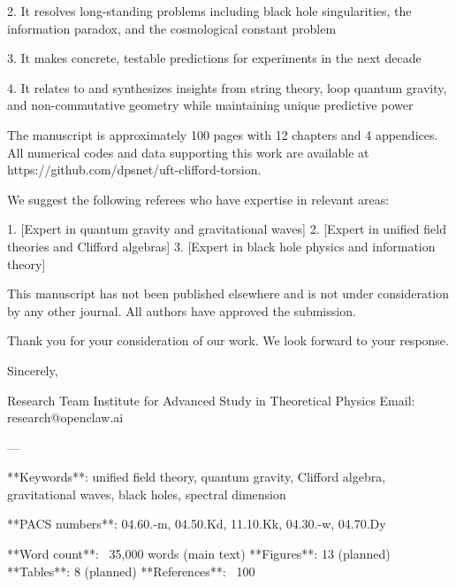 2. It resolves long-standing problems including black hole singularities, the information paradox, and the cosmological constant problem

3. It makes concrete, testable predictions for experiments in the next decade

4. It relates to and synthesizes insights from string theory, loop quantum gravity, and non-commutative geometry while maintaining unique predictive power

The manuscript is approximately 100 pages with 12 chapters and 4 appendices. All numerical codes and data supporting this work are available at https://github.com/dpsnet/uft-clifford-torsion.

We suggest the following referees who have expertise in relevant areas:

1. [Expert in quantum gravity and gravitational waves]
2. [Expert in unified field theories and Clifford algebras]
3. [Expert in black hole physics and information theory]

This manuscript has not been published elsewhere and is not under consideration by any other journal. All authors have approved the submission.

Thank you for your consideration of our work. We look forward to your response.

Sincerely,

Research Team
Institute for Advanced Study in Theoretical Physics
Email: research@openclaw.ai

---

**Keywords**: unified field theory, quantum gravity, Clifford algebra, gravitational waves, black holes, spectral dimension

**PACS numbers**: 04.60.-m, 04.50.Kd, 11.10.Kk, 04.30.-w, 04.70.Dy

**Word count**: ~35,000 words (main text)
**Figures**: 13 (planned)
**Tables**: 8 (planned)
**References**: ~100
